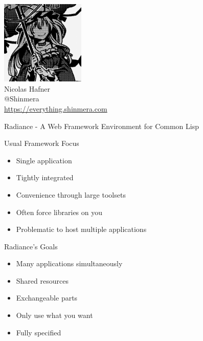 \documentclass[12pt]{beamer}
\newcommand{\toptitle}[1]{
  {\huge #1} \\
  \vspace{0.2cm}
}
\begin{document}
\begin{frame}
  \begin{center}
    \includegraphics[height=4cm]{avatar.png}\\
    \vspace{0.2cm}
    {\Large Nicolas Hafner} \\
    \vspace{0.2cm}
    {\Huge @Shinmera} \\
    \vspace{0.2cm}
    \url{https://everything.shinmera.com}
  \end{center}
\end{frame}

\begin{frame}
  \toptitle{Radiance - A Web Framework Environment for Common Lisp}
\end{frame}

\begin{frame}
  \toptitle{Usual Framework Focus}
  \begin{itemize}
    \item Single application
    \item Tightly integrated
    \item Convenience through large toolsets
      \pause
    \item Often force libraries on you
      \pause
    \item Problematic to host multiple applications
  \end{itemize}
\end{frame}

\begin{frame}
  \toptitle{Radiance's Goals}
  \begin{itemize}
    \item Many applications simultaneously
    \item Shared resources
    \item Exchangeable parts
    \item Only use what you want
      \pause
    \item Fully specified
  \end{itemize}
\end{frame}
\end{document}
